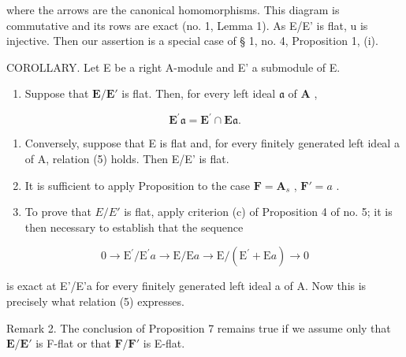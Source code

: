 where the arrows are the canonical homomorphisms. This diagram is commutative and its rows are exact (no. 1, Lemma 1). As E/E' is flat, u is injective. Then our assertion is a special case of § 1, no. 4, Proposition 1, (i).

COROLLARY. Let E be a right A-module and E' a submodule of E.

\begin{enumerate}
\def\labelenumi{(\roman{enumi})}
\tightlist
\item
  Suppose that \(\mathbf{E} / \mathbf{E}'\) is flat. Then, for every left ideal \(\mathfrak{a}\) of \(\mathbf{A}\) ,
\end{enumerate}

\[
\mathbf {E} ^ {\prime} \mathfrak {a} = \mathbf {E} ^ {\prime} \cap \mathbf {E} \mathfrak {a}.\tag{5}
\]

\begin{enumerate}
\def\labelenumi{(\roman{enumi})}
\setcounter{enumi}{1}
\item
  Conversely, suppose that E is flat and, for every finitely generated left ideal a of A, relation (5) holds. Then E/E' is flat.
\item
  It is sufficient to apply Proposition to the case \(\mathbf{F} = \mathbf{A}_s\) , \(\mathbf{F}' = a\) .
\item
  To prove that \(E/E'\) is flat, apply criterion (c) of Proposition 4 of no. 5; it is then necessary to establish that the sequence
\end{enumerate}

\[
0 \rightarrow \mathrm{E} ^ {\prime} / \mathrm{E} ^ {\prime} a \rightarrow \mathrm{E} / \mathrm{E} a \rightarrow \mathrm{E} / (\mathrm{E} ^ {\prime} + \mathrm{E} a) \rightarrow 0
\]

is exact at E'/E'a for every finitely generated left ideal a of A. Now this is precisely what relation (5) expresses.

Remark 2. The conclusion of Proposition 7 remains true if we assume only that \(\mathbf{E} / \mathbf{E}'\) is F-flat or that \(\mathbf{F} / \mathbf{F}'\) is E-flat.

